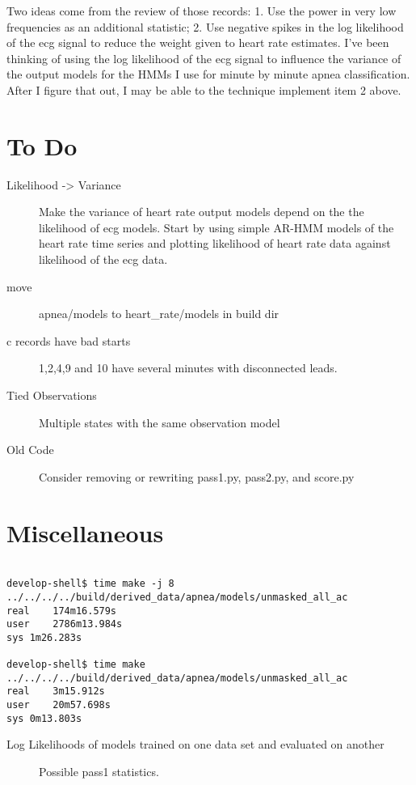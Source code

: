 \documentclass[12pt]{article}
\begin{document}
Two ideas come from the review of those records: 1. Use the power in
very low frequencies as an additional statistic; 2. Use negative
spikes in the log likelihood of the ecg signal to reduce the weight
given to heart rate estimates.  I've been thinking of using the log
likelihood of the ecg signal to influence the variance of the output
models for the HMMs I use for minute by minute apnea classification.
After I figure that out, I may be able to the technique implement item
2 above.


\section{To Do}
\label{sec:todo}

\begin{description}
\item[Likelihood -> Variance] Make the variance of heart rate output
  models depend on the the likelihood of ecg models.  Start by using
  simple AR-HMM models of the heart rate time series and plotting
  likelihood of heart rate data against likelihood of the ecg data.
\item[move] apnea/models to heart\_rate/models in build dir
\item[c records have bad starts] 1,2,4,9 and 10 have several minutes
  with disconnected leads.
\item[Tied Observations] Multiple states with the same observation
  model
\item[Old Code] Consider removing or rewriting pass1.py, pass2.py, and
  score.py 
\end{description}

\section{Miscellaneous}
\label{sec:misc}
\begin{verbatim}

develop-shell$ time make -j 8 ../../../../build/derived_data/apnea/models/unmasked_all_ac  
real	174m16.579s
user	2786m13.984s
sys	1m26.283s

develop-shell$ time make ../../../../build/derived_data/apnea/models/unmasked_all_ac
real	3m15.912s
user	20m57.698s
sys	0m13.803s

\end{verbatim}

\begin{table}
  \centering
   
  \caption[Log Likelihoods]{Log Likelihoods of models trained on one
    data set and evaluated on another}
  \label{tab:log_likelihoods}
\end{table}

\begin{figure}
  \centering
    \caption{Possible pass1 statistics.}
  \label{fig:statistics}
\end{figure}
\end{document}
